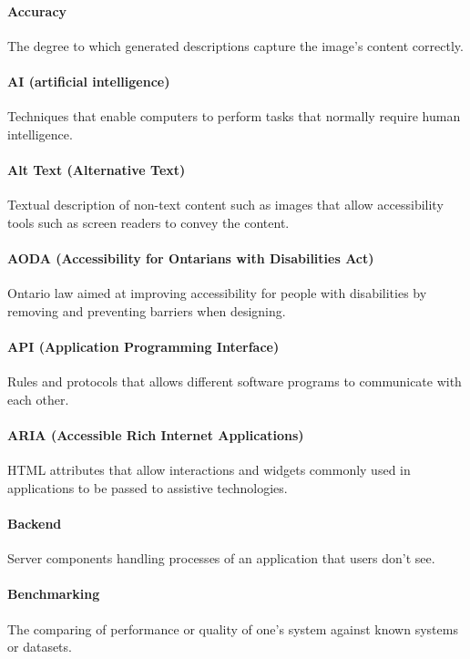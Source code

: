 \documentclass[12pt]{article}
\begin{document}
\paragraph*{Accuracy}
The degree to which generated descriptions capture the image’s content correctly.

\paragraph*{AI (artificial intelligence)}
Techniques that enable computers to perform tasks that normally require human intelligence.

\paragraph*{Alt Text (Alternative Text)}
Textual description of non-text content such as images that allow accessibility tools such as screen readers to convey the content.

\paragraph*{AODA (Accessibility for Ontarians with Disabilities Act)}
Ontario law aimed at improving accessibility for people with disabilities by removing and preventing barriers when designing.

\paragraph*{API (Application Programming Interface)}
Rules and protocols that allows different software programs to communicate with each other.

\paragraph*{ARIA (Accessible Rich Internet Applications)}
HTML attributes that allow interactions and widgets commonly used in applications to be passed to assistive technologies.

\paragraph*{Backend}
Server components handling processes of an application that users don't see.

\paragraph*{Benchmarking}
The comparing of performance or quality of one's system against known systems or datasets.
\end{document}
